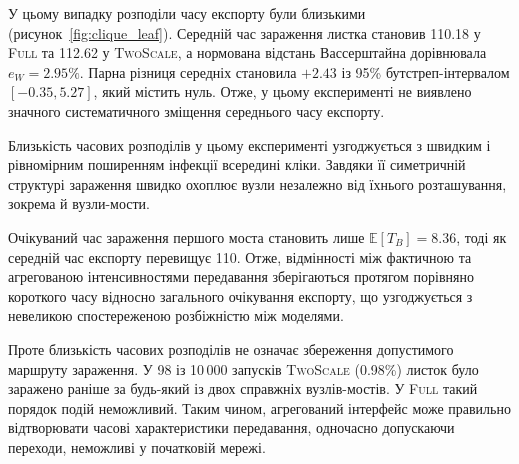 \documentclass[a4paper,fleqn]{cas-sc}
\newcommand{\Full}{\textup{\textsc{Full}}}
\newcommand{\TS}{\textup{\textsc{TwoScale}}}
\newcommand{\eW}{e_{W}}
\begin{document}
У цьому випадку розподіли часу експорту
були близькими (рисунок~\ref{fig:clique_leaf}).
Середній час зараження листка становив
110.18 у \Full{} та 112.62 у \TS{},
а нормована відстань Вассерштайна
дорівнювала $\eW=2.95\%$.
Парна різниця середніх становила $+2.43$
із 95\% бутстреп-інтервалом $[-0.35,5.27]$,
який містить нуль. Отже, у цьому експерименті
не виявлено значного систематичного
зміщення середнього часу експорту.

Близькість часових розподілів у цьому
експерименті узгоджується з швидким
і рівномірним поширенням інфекції
всередині кліки. Завдяки її симетричній
структурі зараження швидко охоплює
вузли незалежно від їхнього розташування,
зокрема й вузли-мости.

Очікуваний час зараження першого моста
становить лише $\mathbb{E}[T_B]=8.36$,
тоді як середній час експорту перевищує 110.
Отже, відмінності між фактичною
та агрегованою інтенсивностями передавання
зберігаються протягом порівняно короткого
часу відносно загального очікування експорту,
що узгоджується з невеликою спостереженою
розбіжністю між моделями.

Проте близькість часових розподілів
не означає збереження допустимого
маршруту зараження.
У 98 із 10\,000 запусків \TS{} (0.98\%)
листок було заражено раніше за будь-який
із двох справжніх вузлів-мостів.
У \Full{} такий порядок подій неможливий.
Таким чином, агрегований інтерфейс може
правильно відтворювати часові характеристики
передавання, одночасно допускаючи
переходи, неможливі у початковій мережі.
\end{document}
